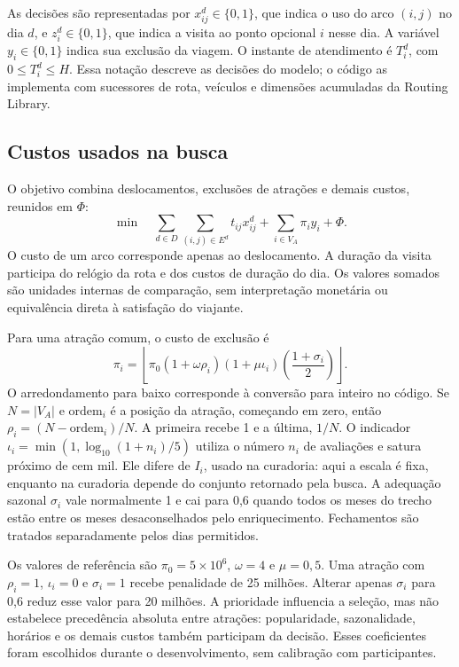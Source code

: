 As decisões são representadas por $x_{ij}^d\in\{0,1\}$, que indica o uso do arco $(i,j)$ no dia $d$, e $z_i^d\in\{0,1\}$, que indica a visita ao ponto opcional $i$ nesse dia. A variável $y_i\in\{0,1\}$ indica sua exclusão da viagem. O instante de atendimento é $T_i^d$, com $0\leq T_i^d\leq H$. Essa notação descreve as decisões do modelo; o código as implementa com sucessores de rota, veículos e dimensões acumuladas da Routing Library.

\subsection*{Custos usados na busca}

O objetivo combina deslocamentos, exclusões de atrações e demais custos, reunidos em $\Phi$:
\begin{equation}
\min\quad
\sum_{d\in D}\sum_{(i,j)\in E^d} t_{ij}x_{ij}^d
+\sum_{i\in V_A}\pi_i y_i+\Phi .
\label{eq:objetivo-interlude}
\end{equation}
O custo de um arco corresponde apenas ao deslocamento. A duração da visita participa do relógio da rota e dos custos de duração do dia. Os valores somados são unidades internas de comparação, sem interpretação monetária ou equivalência direta à satisfação do viajante.

Para uma atração comum, o custo de exclusão é
\begin{equation}
\pi_i=\left\lfloor\pi_0(1+\omega\rho_i)(1+\mu\iota_i)
\left(\frac{1+\sigma_i}{2}\right)\right\rfloor .
\label{eq:penalidade-interlude}
\end{equation}
O arredondamento para baixo corresponde à conversão para inteiro no código. Se $N=|V_A|$ e $\mathrm{ordem}_i$ é a posição da atração, começando em zero, então $\rho_i=(N-\mathrm{ordem}_i)/N$. A primeira recebe 1 e a última, $1/N$. O indicador $\iota_i=\min(1,\log_{10}(1+n_i)/5)$ utiliza o número $n_i$ de avaliações e satura próximo de cem mil. Ele difere de $I_i$, usado na curadoria: aqui a escala é fixa, enquanto na curadoria depende do conjunto retornado pela busca. A adequação sazonal $\sigma_i$ vale normalmente 1 e cai para 0,6 quando todos os meses do trecho estão entre os meses desaconselhados pelo enriquecimento. Fechamentos são tratados separadamente pelos dias permitidos.

Os valores de referência são $\pi_0=5\times10^6$, $\omega=4$ e $\mu=0{,}5$. Uma atração com $\rho_i=1$, $\iota_i=0$ e $\sigma_i=1$ recebe penalidade de 25 milhões. Alterar apenas $\sigma_i$ para 0,6 reduz esse valor para 20 milhões. A prioridade influencia a seleção, mas não estabelece precedência absoluta entre atrações: popularidade, sazonalidade, horários e os demais custos também participam da decisão. Esses coeficientes foram escolhidos durante o desenvolvimento, sem calibração com participantes.

